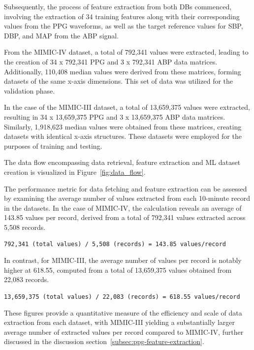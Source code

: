 Subsequently, the process of feature extraction from both DBs commenced, involving the extraction of 34 training features along with their corresponding values from the PPG waveforms,
as well as the target reference values for SBP, DBP, and MAP from the ABP signal.

From the MIMIC-IV dataset, a total of 792,341 values were extracted, leading to the creation of 34 x 792,341 PPG and 3 x 792,341 ABP data matrices.
Additionally, 110,408 median values were derived from these matrices, forming datasets of the same x-axis dimensions.
This set of data was utilized for the validation phase.

In the case of the MIMIC-III dataset, a total of 13,659,375 values were extracted, resulting in 34 x 13,659,375 PPG and 3 x 13,659,375 ABP data matrices.
Similarly, 1,918,623 median values were obtained from these matrices, creating datasets with identical x-axis structures.
These datasets were employed for the purposes of training and testing.

The data flow encompassing data retrieval, feature extraction and ML dataset creation is visualized in Figure~\ref{fig:data_flow}.

The performance metric for data fetching and feature extraction can be assessed by examining the average number of values extracted from each 10-minute record in the datasets.
In the case of MIMIC-IV, the calculation reveals an average of 143.85 values per record, derived from a total of 792,341 values extracted across 5,508 records.

\vspace{0.3cm}
\texttt{792,341 (total values) / 5,508 (records) = 143.85 values/record}
\vspace{0.3cm}

In contrast, for MIMIC-III, the average number of values per record is notably higher at 618.55, computed from a total of 13,659,375 values obtained from 22,083 records.

\vspace{0.3cm}
\texttt{13,659,375 (total values) / 22,083 (records) = 618.55 values/record}
\vspace{0.3cm}

These figures provide a quantitative measure of the efficiency and scale of data extraction from each dataset, with MIMIC-III yielding a substantially larger average number of extracted values per record
compared to MIMIC-IV, further discussed in the discussion section~\ref{subsec:ppg-feature-extraction}.

